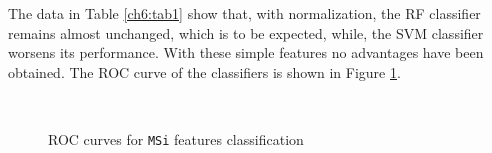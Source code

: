 The data in Table \ref{ch6:tab1} show that, with normalization, the \Gls{RF} classifier remains almost unchanged, which is to be expected, while, the \Gls{SVM} classifier
worsens its performance. With these simple features no advantages have been obtained. The \Gls{ROC} curve of the classifiers is shown in Figure \ref{ch6:fig1}.

\begin{figure}[!htb]
  \centering
    \hspace{1mm}
    \\
    \hspace{1mm}
    \caption{ROC curves for \texttt{MSi} features classification}
    \label{ch6:fig1}
\end{figure}

